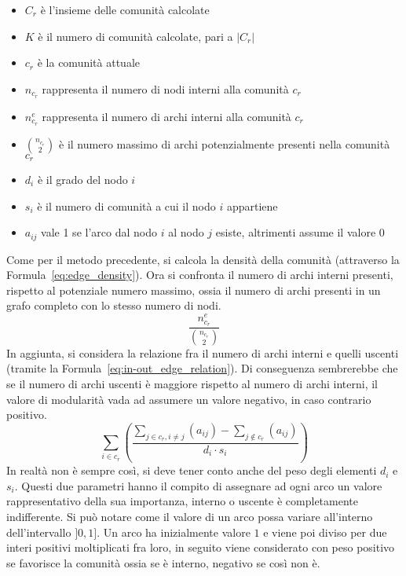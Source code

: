 \begin{itemize}
	\item $C_r$ è l'insieme delle comunità calcolate
	\item $K$ è il numero di comunità calcolate, pari a $|C_r|$
	\item $c_r$ è la comunità attuale
	\item $n_{c_r}$ rappresenta il numero di nodi interni alla comunità $c_r$
	\item $n^e_{c_r}$ rappresenta il numero di archi interni alla comunità $c_r$
	\item $\binom{n_{c_r}}{2}$ è il numero massimo di archi potenzialmente presenti nella comunità $c_r$
	\item $d_i$ è il grado del nodo $i$
	\item $s_i$ è il numero di comunità a cui il nodo $i$ appartiene
	\item $a_{ij}$ vale 1 se l'arco dal nodo $i$ al nodo $j$ esiste, altrimenti assume il valore 0
\end{itemize}
%
Come per il metodo precedente, si calcola la densità della comunità (attraverso la Formula~\ref{eq:edge_density}). Ora si confronta il numero di archi interni presenti, rispetto al potenziale numero massimo, ossia il numero di archi presenti in un grafo completo con lo stesso numero di nodi.
\begin{equation}
	\frac{ n^e_{c_r} }{ \binom{n_{c_r}}{2} }
	\label{eq:edge_density}
\end{equation}
%
In aggiunta, si considera la relazione fra il numero di archi interni e quelli uscenti (tramite la Formula~\ref{eq:in-out_edge_relation}). Di conseguenza sembrerebbe che se il numero di archi uscenti è maggiore rispetto al numero di archi interni, il valore di modularità vada ad assumere un valore negativo, in caso contrario positivo.\\
\begin{equation}
	\sum\limits_{i \in c_r} \left( \frac{
		\sum\limits_{j \in c_r, i \neq j} \left( a_{ij} \right) - 
		\sum\limits_{j \notin c_r} \left( a_{ij} \right) 
	} {d_i \cdot s_i} \right)
	\label{eq:in-out_edge_relation}
\end{equation}
In realtà non è sempre così, si deve tener conto anche del peso degli elementi $d_i$ e $s_i$. Questi due parametri hanno il compito di assegnare ad ogni arco un valore rappresentativo della sua importanza, interno o uscente è completamente indifferente. Si può notare come il valore di un arco possa variare all'interno dell'intervallo $]0, 1]$. Un arco ha inizialmente valore $1$ e viene poi diviso per due interi positivi moltiplicati fra loro, in seguito viene considerato con peso positivo se favorisce la comunità ossia se è interno, negativo se così non è.\\
